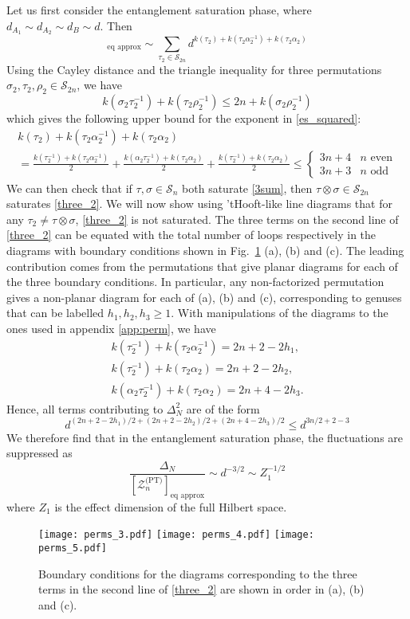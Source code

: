 \documentclass[a4paper,11pt]{article}
\newcommand{\be}{\begin{equation}}
\newcommand{\ee}{\end{equation}}
\newcommand\sS{{\mathcal S}}
\newcommand\sZ{{\mathcal Z}}
\begin{document}
\begin{enumerate}
\begin{appendix}
Let us first consider the entanglement saturation phase, where $d_{A_1} \sim d_{A_2} \sim d_B\sim d$. Then 
\be 
[(\sZ_n^{\rm (PT)})^2]_{\text{eq approx}} \sim \sum_{\tau_2 \in \sS_{2n}} d^{k(\tau_2)+ k(\tau_2 \alpha_2^{-1}) + k(\tau_2 \alpha_2)}
\label{es_squared}
\ee
Using the Cayley distance and the triangle inequality for three permutations $\sigma_2, \tau_2, \rho_2 \in \sS_{2n}$, we have 
\be 
k(\sigma_2 \tau_2^{-1}) + k(\tau_2 \rho_2^{-1}) \leq 2n + k(\sigma_2 \rho_2^{-1})
\ee
which gives the following upper bound for the exponent in \eqref{es_squared}: 
\be 
\begin{gathered} 
k(\tau_2)+ k(\tau_2 \alpha_2^{-1}) + k(\tau_2 \alpha_2)\\ = \frac{k(\tau_2^{-1})+ k(\tau_2 \alpha_2^{-1})}{2} + \frac{k( \alpha_2\tau_2^{-1}) + k(\tau_2 \alpha_2) }{2}+ \frac{k(\tau_2^{-1}) + k(\tau_2 \alpha_2)}{2} \leq \begin{cases} 3n + 4 & n \text{ even} \\ 3n + 3 & n \text{ odd}
\end{cases} 
\end{gathered}
\label{three_2}
\ee
We can then check that if $\tau, \sigma \in \sS_n$ both saturate \eqref{3sum}, then $\tau\otimes \sigma \in \sS_{2n}$ saturates \eqref{three_2}. We will now show using 'tHooft-like line diagrams that for any $\tau_2 \neq \tau \otimes \sigma$, \eqref{three_2} is not saturated. The three terms on the second line of \eqref{three_2} can be equated with the total number of loops respectively in the diagrams with boundary conditions shown in Fig.~\ref{fig:dev} (a), (b) and (c). The leading contribution comes from the permutations that give planar diagrams for each of the three boundary conditions. In particular, any non-factorized permutation gives a non-planar diagram for each of (a), (b) and (c), corresponding to genuses that can be labelled $h_1, h_2, h_3 \geq 1$. With manipulations of the diagrams to the ones used in appendix \ref{app:perm}, we have 
\be 
\begin{gathered} 
k(\tau_2^{-1})+ k(\tau_2 \alpha_2^{-1}) = 2n +2 -2 h_1, \\ k(\tau_2^{-1}) + k(\tau_2 \alpha_2)= 2n +2 -2 h_2, \\
 k( \alpha_2\tau_2^{-1}) + k(\tau_2 \alpha_2) = 2n +4 - 2h_3. 
 \end{gathered} 
\ee
Hence, all terms contributing to $\Delta_N^2$ are of the form 
\be 
d^{(2n+2-2h_1)/2+ (2n+2-2h_2)/2 + (2n+4-2h_3)/2} \leq d^{3n/2+2-3} 
\ee
We therefore find that in the entanglement saturation phase, the fluctuations are suppressed as 
\be 
\frac{\Delta_N}{[\sZ_n^{\text{(PT)}}]_{\text{eq approx}}} \sim d^{-3/2} \sim Z_1^{-1/2}
\ee
where $Z_1$ is the effect dimension of the full Hilbert space. 
\begin{figure}[]
\texttt{[image: perms\_3.pdf]}
\texttt{[image: perms\_4.pdf]}
\texttt{[image: perms\_5.pdf]}
\caption{Boundary conditions for the diagrams corresponding to the three terms in the second line of \eqref{three_2} are shown in order in (a), (b) and (c).}
\label{fig:dev}
\end{figure} 


\end{appendix}
\end{enumerate}
\end{document}
